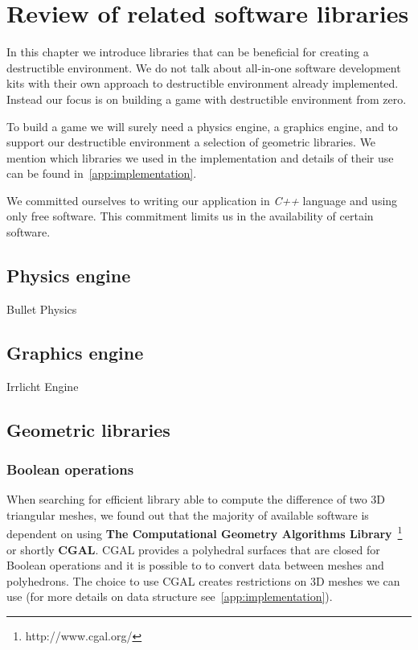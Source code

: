 \chapter{Review of related software libraries}
\label{chapt:technology}
In this chapter we introduce libraries that can be beneficial for creating a destructible environment. We do not talk about all-in-one software development kits with their own approach to destructible environment already implemented. Instead our focus is on building a game with destructible environment from zero.  

To build a game we will surely need a physics engine, a graphics engine, and to support our destructible environment a selection of geometric libraries. We mention which libraries we used in the implementation and details of their use can be found in~\cref{app:implementation}.

We committed ourselves to writing our application in \emph{C++} language and using only free software. This commitment limits us in the  availability of certain software.

\section{Physics engine}
Bullet Physics


\section{Graphics engine}
Irrlicht Engine

\section{Geometric libraries}

\subsection{Boolean operations}

When searching for efficient library able to compute the difference of two 3D triangular meshes, we found out that the majority of available software is dependent on using \textbf{The Computational Geometry Algorithms Library}~\footnote{http://www.cgal.org/} or shortly \textbf{CGAL}. CGAL provides a polyhedral surfaces that are closed for Boolean operations and it is possible to to convert data between meshes and polyhedrons. The choice to use CGAL creates restrictions on 3D meshes we can use (for more details on data structure see~\cref{app:implementation}).

